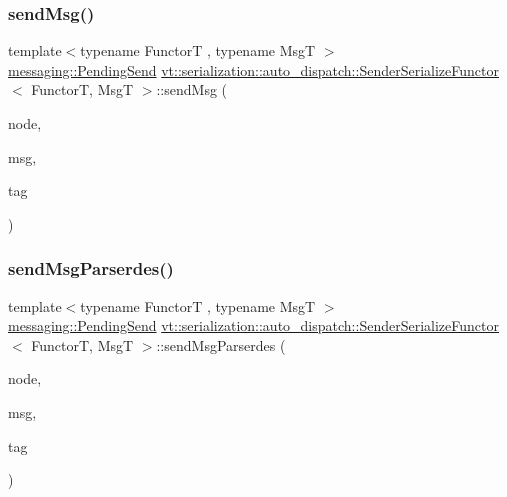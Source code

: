 \subsubsection{\texorpdfstring{send\+Msg()}{sendMsg()}}
{\footnotesize\ttfamily template$<$typename FunctorT , typename MsgT $>$ \\
\hyperlink{structvt_1_1messaging_1_1_pending_send}{messaging\+::\+Pending\+Send} \hyperlink{structvt_1_1serialization_1_1auto__dispatch_1_1_sender_serialize_functor}{vt\+::serialization\+::auto\+\_\+dispatch\+::\+Sender\+Serialize\+Functor}$<$ FunctorT, MsgT $>$\+::send\+Msg (\begin{DoxyParamCaption}\item[{\hyperlink{namespacevt_a866da9d0efc19c0a1ce79e9e492f47e2}{Node\+Type} const \&}]{node,  }\item[{MsgT $\ast$}]{msg,  }\item[{\hyperlink{namespacevt_a84ab281dae04a52a4b243d6bf62d0e52}{Tag\+Type} const \&}]{tag }\end{DoxyParamCaption})\hspace{0.3cm}{\ttfamily [static]}}

\mbox{\label{structvt_1_1serialization_1_1auto__dispatch_1_1_sender_serialize_functor_a43be60ab9baf2f5de77cbb246b326e03}} 
\subsubsection{\texorpdfstring{send\+Msg\+Parserdes()}{sendMsgParserdes()}}
{\footnotesize\ttfamily template$<$typename FunctorT , typename MsgT $>$ \\
\hyperlink{structvt_1_1messaging_1_1_pending_send}{messaging\+::\+Pending\+Send} \hyperlink{structvt_1_1serialization_1_1auto__dispatch_1_1_sender_serialize_functor}{vt\+::serialization\+::auto\+\_\+dispatch\+::\+Sender\+Serialize\+Functor}$<$ FunctorT, MsgT $>$\+::send\+Msg\+Parserdes (\begin{DoxyParamCaption}\item[{\hyperlink{namespacevt_a866da9d0efc19c0a1ce79e9e492f47e2}{Node\+Type} const \&}]{node,  }\item[{MsgT $\ast$}]{msg,  }\item[{\hyperlink{namespacevt_a84ab281dae04a52a4b243d6bf62d0e52}{Tag\+Type} const \&}]{tag }\end{DoxyParamCaption})\hspace{0.3cm}{\ttfamily [static]}}



